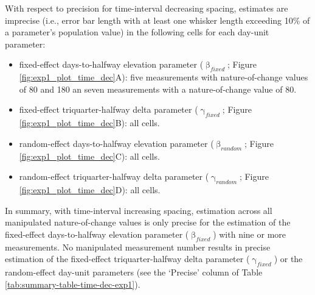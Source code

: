\documentclass[
12pt, %
twoside,
english]{guelphthesis}
\theoremstyle{definition}
\theoremstyle{definition}
\theoremstyle{definition}
\theoremstyle{definition}
\theoremstyle{remark}
\begin{document}
With respect to precision for time-interval decreasing spacing, estimates are imprecise (i.e., error bar length with at least one whisker length exceeding 10\% of a parameter's population value) in the following cells for each day-unit parameter:
\begin{itemize}
\tightlist
\item
  fixed-effect days-to-halfway elevation parameter (\(\upbeta_{fixed}\); Figure \ref{fig:exp1_plot_time_dec}A): five measurements with nature-of-change values of 80 and 180 an seven measurements with a nature-of-change value of 80.
\item
  fixed-effect triquarter-halfway delta parameter (\(\upgamma_{fixed}\); Figure \ref{fig:exp1_plot_time_dec}B): all cells.
\item
  random-effect days-to-halfway elevation parameter (\(\upbeta_{random}\); Figure \ref{fig:exp1_plot_time_dec}C): all cells.
\item
  random-effect triquarter-halfway delta parameter (\(\upgamma_{random}\); Figure \ref{fig:exp1_plot_time_dec}D): all cells.
\end{itemize}
In summary, with time-interval increasing spacing, estimation across all manipulated nature-of-change values is only precise for the estimation of the fixed-effect days-to-halfway elevation parameter (\(\upbeta_{fixed}\)) with nine or more measurements. No manipulated measurement number results in precise estimation of the fixed-effect triquarter-halfway delta parameter (\(\upgamma_{fixed}\)) or the random-effect day-unit parameters (see the `Precise' column of Table \ref{tab:summary-table-time-dec-exp1}).
\end{document}

